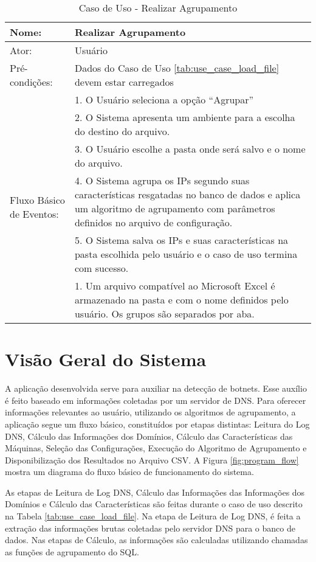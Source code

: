 \begin{table}[]
\centering
\caption{Caso de Uso - Realizar Agrupamento}
\label{tab:use_case_clutering}
\begin{tabular}{|lp{10cm}|}
\hline
Nome: & Realizar Agrupamento  \\ \hline
Ator: & Usuário   \\ \hline
Pré-condições: & Dados do Caso de Uso \ref{tab:use_case_load_file} devem estar carregados   \\ \hline
\multirow{12}{*}{Fluxo Básico de Eventos:} & 1. O Usuário seleciona a opção ``Agrupar''  \\
 & 2. O Sistema apresenta um ambiente para a escolha do destino do arquivo. \\
 & 3. O Usuário escolhe a pasta onde será salvo e o nome do arquivo. \\
 & 4. O Sistema agrupa os IPs segundo suas características resgatadas no banco de dados e aplica um algoritmo de agrupamento com parâmetros definidos no arquivo de configuração.  \\
 & 5. O Sistema salva os IPs e suas características na pasta escolhida pelo usuário e o caso de uso termina com sucesso. \\
 \hline
\multirow{3}{*}{Pós-Condições:} & 1. Um arquivo compatível ao Microsoft Excel é armazenado na pasta e com o nome definidos pelo usuário. Os grupos são separados por aba. \\
\hline
\end{tabular}
\end{table}

\section{Visão Geral do Sistema}
A aplicação desenvolvida serve para auxiliar na detecção de botnets. Esse auxílio é feito baseado em informações coletadas por um servidor de DNS. Para oferecer informações relevantes ao usuário, utilizando os algoritmos de agrupamento, a aplicação segue um fluxo básico, constituídos por etapas distintas: Leitura do Log DNS, Cálculo das Informações dos Domínios, Cálculo das Características das Máquinas, Seleção das Configurações, Execução do Algoritmo de Agrupamento e Disponibilização dos Resultados no Arquivo CSV. A Figura \ref{fig:program_flow} mostra um diagrama do fluxo básico de funcionamento do sistema.

As etapas de Leitura de Log DNS, Cálculo das Informações das Informações dos Domínios e Cálculo das Características são feitas durante o caso de uso descrito na Tabela \ref{tab:use_case_load_file}. Na etapa de Leitura de Log DNS, é feita a extração das informações brutas coletadas pelo servidor DNS para o banco de dados. Nas etapas de Cálculo, as informações são calculadas utilizando chamadas as funções de agrupamento do SQL.

